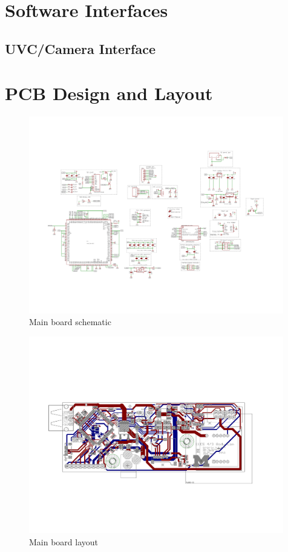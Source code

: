 \documentclass[12pt]{article}
\begin{document}
\newpage

\section{Software Interfaces}
\label{app:software_interfaces}

\subsection{UVC/Camera Interface}


\newpage

\section{PCB Design and Layout}

\begin{figure}[h]
    \centering
    \includegraphics[angle=-90,width=0.99\textwidth]{BodyCamBoard_sch}
    \caption{Main board schematic}
\end{figure}

\begin{figure}[h]
    \centering
    \includegraphics[angle=-90,width=0.99\textwidth]{BodyCamBoard_brd}
    \caption{Main board layout}
\end{figure}
\end{document}
